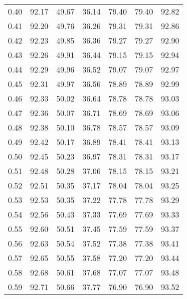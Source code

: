 \begin{tabular}{|c|c|c|c|c|c|c|}
      0.40 &     92.17 &     49.67 &      36.14 &   79.40 &      79.40 &         92.82 \\
      0.41 &     92.20 &     49.76 &      36.26 &   79.31 &      79.31 &         92.86 \\
      0.42 &     92.23 &     49.85 &      36.36 &   79.27 &      79.27 &         92.90 \\
      0.43 &     92.26 &     49.91 &      36.44 &   79.15 &      79.15 &         92.94 \\
      0.44 &     92.29 &     49.96 &      36.52 &   79.07 &      79.07 &         92.97 \\
      0.45 &     92.31 &     49.97 &      36.56 &   78.89 &      78.89 &         92.99 \\
      0.46 &     92.33 &     50.02 &      36.64 &   78.78 &      78.78 &         93.03 \\
      0.47 &     92.36 &     50.07 &      36.71 &   78.69 &      78.69 &         93.06 \\
      0.48 &     92.38 &     50.10 &      36.78 &   78.57 &      78.57 &         93.09 \\
      0.49 &     92.42 &     50.17 &      36.89 &   78.41 &      78.41 &         93.13 \\
      0.50 &     92.45 &     50.23 &      36.97 &   78.31 &      78.31 &         93.17 \\
      0.51 &     92.48 &     50.28 &      37.06 &   78.15 &      78.15 &         93.21 \\
      0.52 &     92.51 &     50.35 &      37.17 &   78.04 &      78.04 &         93.25 \\
      0.53 &     92.53 &     50.35 &      37.22 &   77.78 &      77.78 &         93.29 \\
      0.54 &     92.56 &     50.43 &      37.33 &   77.69 &      77.69 &         93.33 \\
      0.55 &     92.60 &     50.51 &      37.45 &   77.59 &      77.59 &         93.37 \\
      0.56 &     92.63 &     50.54 &      37.52 &   77.38 &      77.38 &         93.41 \\
      0.57 &     92.65 &     50.55 &      37.58 &   77.20 &      77.20 &         93.44 \\
      0.58 &     92.68 &     50.61 &      37.68 &   77.07 &      77.07 &         93.48 \\
      0.59 &     92.71 &     50.66 &      37.77 &   76.90 &      76.90 &         93.52 \\

\end{tabular}
